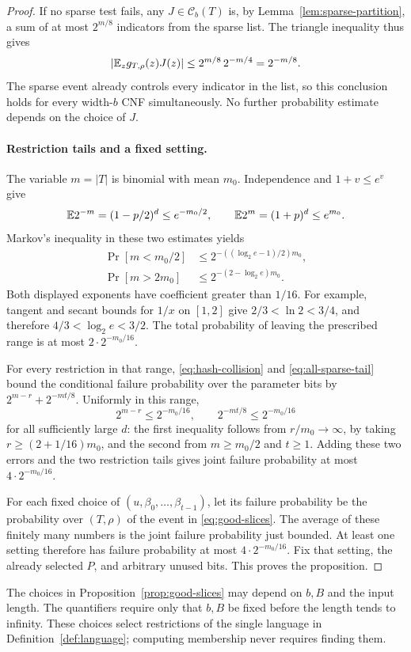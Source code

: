 \begin{proof}
If no sparse test fails, any $J\in\mathcal C_b(T)$ is, by
Lemma~\ref{lem:sparse-partition}, a sum of at most $2^{m/8}$ indicators
from the sparse list.  The triangle inequality thus gives
\begin{equation}\label{eq:all-width-tests}
 \left|\mathbb E_z g_{T,\rho}(z)J(z)\right|
 \le2^{m/8}\,2^{-m/4}=2^{-m/8}.
\end{equation}
The sparse event already controls every indicator in the list, so this
conclusion holds for every width-$b$ CNF simultaneously.  No further
probability estimate depends on the choice of $J$.

\paragraph{Restriction tails and a fixed setting.}
The variable $m=|T|$ is binomial with mean $m_0$.  Independence and
$1+v\le e^v$ give
\[
 \mathbb E 2^{-m}=(1-p/2)^d\le e^{-m_0/2},\qquad
 \mathbb E 2^m=(1+p)^d\le e^{m_0}.
\]
Markov's inequality in these two estimates yields
\begin{align}
 \Pr[m<m_0/2]
 &\le2^{-((\log_2e-1)/2)m_0},\label{eq:live-lower-tail}\\
 \Pr[m>2m_0]
 &\le2^{-(2-\log_2e)m_0}.\label{eq:live-upper-tail}
\end{align}
Both displayed exponents have coefficient greater than $1/16$.
For example, tangent and secant bounds for $1/x$ on $[1,2]$ give
$2/3<\ln2<3/4$, and therefore $4/3<\log_2e<3/2$.
The total probability of leaving the prescribed range is at most
$2\cdot2^{-m_0/16}$.

For every restriction in that range, \eqref{eq:hash-collision} and
\eqref{eq:all-sparse-tail} bound the conditional failure probability over
the parameter bits by $2^{m-r}+2^{-mt/8}$.  Uniformly in this range,
\[
 2^{m-r}\le2^{-m_0/16},\qquad
 2^{-mt/8}\le2^{-m_0/16}
\]
for all sufficiently large $d$: the first inequality follows from
$r/m_0\to\infty$, by taking $r\ge(2+1/16)m_0$, and the second from
$m\ge m_0/2$ and $t\ge1$.  Adding these two errors and the two
restriction tails gives joint failure probability at most
$4\cdot2^{-m_0/16}$.

For each fixed choice of $(u,\beta_0,\ldots,\beta_{t-1})$, let its failure
probability be the probability over $(T,\rho)$ of the event in
\eqref{eq:good-slices}.  The average of these finitely many numbers is
the joint failure probability just bounded.  At least one setting
therefore has failure probability at most $4\cdot2^{-m_0/16}$.
Fix that setting, the already selected $P$, and arbitrary unused bits.
This proves the proposition.
\end{proof}

The choices in Proposition~\ref{prop:good-slices} may depend on $b,B$
and the input length.  The quantifiers require only that $b,B$ be fixed
before the length tends to infinity.  These choices select restrictions
of the single language in Definition~\ref{def:language}; computing
membership never requires finding them.
